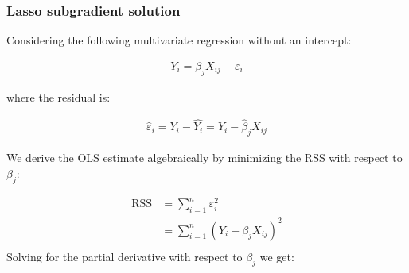 





\subsubsection{Lasso subgradient solution}
\label{subgradient}

\noindent Considering the following multivariate regression without an intercept:

\begin{align*}
Y_{i}= \beta_j X_{ij} +\varepsilon_{i} 
\end{align*}

\noindent  where the residual is:

\begin{align*}
\hat{\varepsilon}_i=Y_i - \hat{Y_i}=Y_i - \hat{\beta}_j X_{ij}
\end{align*}

\noindent We derive the OLS estimate algebraically by minimizing the RSS with respect to $\beta_j$:

\begin{align*}
\operatorname{RSS}&=\sum_{i=1}^{n}\varepsilon_i^2 \\
&= \sum_{i=1}^{n}(Y_{i} -\beta_j X_{ij})^2 \\
\end{align*}
Solving for the partial derivative with respect to $\beta_j$ we get:


